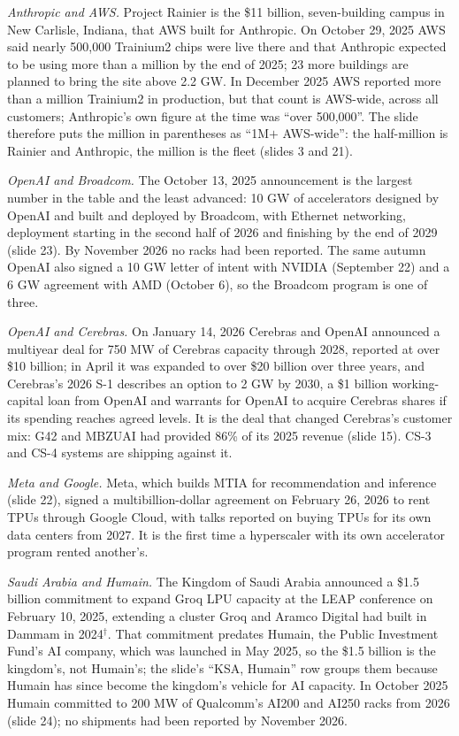 \documentclass[11pt,letterpaper]{article}
\begin{document}
\emph{Anthropic and AWS.} Project Rainier is the \$11 billion, seven-building campus in New Carlisle, Indiana, that AWS built for Anthropic. On October 29, 2025 AWS said nearly 500{,}000 Trainium2 chips were live there and that Anthropic expected to be using more than a million by the end of 2025; 23 more buildings are planned to bring the site above 2.2 GW. In December 2025 AWS reported more than a million Trainium2 in production, but that count is AWS-wide, across all customers; Anthropic's own figure at the time was ``over 500{,}000''. The slide therefore puts the million in parentheses as ``1M$+$ AWS-wide'': the half-million is Rainier and Anthropic, the million is the fleet (slides 3 and 21).

\emph{OpenAI and Broadcom.} The October 13, 2025 announcement is the largest number in the table and the least advanced: 10 GW of accelerators designed by OpenAI and built and deployed by Broadcom, with Ethernet networking, deployment starting in the second half of 2026 and finishing by the end of 2029 (slide 23). By November 2026 no racks had been reported. The same autumn OpenAI also signed a 10 GW letter of intent with NVIDIA (September 22) and a 6 GW agreement with AMD (October 6), so the Broadcom program is one of three.

\emph{OpenAI and Cerebras.} On January 14, 2026 Cerebras and OpenAI announced a multiyear deal for 750 MW of Cerebras capacity through 2028, reported at over \$10 billion; in April it was expanded to over \$20 billion over three years, and Cerebras's 2026 S-1 describes an option to 2 GW by 2030, a \$1 billion working-capital loan from OpenAI and warrants for OpenAI to acquire Cerebras shares if its spending reaches agreed levels. It is the deal that changed Cerebras's customer mix: G42 and MBZUAI had provided 86\% of its 2025 revenue (slide 15). CS-3 and CS-4 systems are shipping against it.

\emph{Meta and Google.} Meta, which builds MTIA for recommendation and inference (slide 22), signed a multibillion-dollar agreement on February 26, 2026 to rent TPUs through Google Cloud, with talks reported on buying TPUs for its own data centers from 2027. It is the first time a hyperscaler with its own accelerator program rented another's.

\emph{Saudi Arabia and Humain.} The Kingdom of Saudi Arabia announced a \$1.5 billion commitment to expand Groq LPU capacity at the LEAP conference on February 10, 2025, extending a cluster Groq and Aramco Digital had built in Dammam in 2024$^\dagger$. That commitment predates Humain, the Public Investment Fund's AI company, which was launched in May 2025, so the \$1.5 billion is the kingdom's, not Humain's; the slide's ``KSA, Humain'' row groups them because Humain has since become the kingdom's vehicle for AI capacity. In October 2025 Humain committed to 200 MW of Qualcomm's AI200 and AI250 racks from 2026 (slide 24); no shipments had been reported by November 2026.
\end{document}
